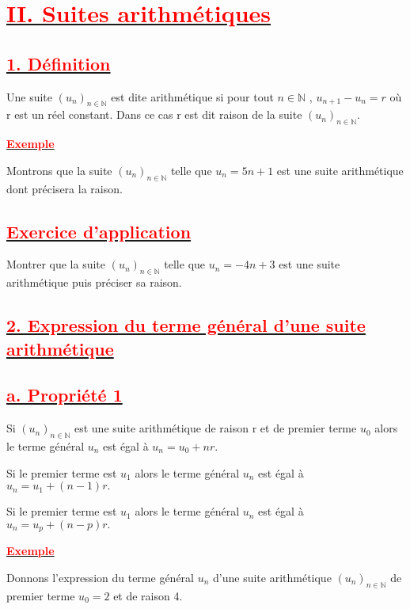\documentclass[12pt]{article}
\begin{document}
\section*{\underline{\textbf{\textcolor{red}{II. Suites arithmétiques}}}}
\subsection*{\underline{\textbf{\textcolor{red}{1. Définition}}}}
Une suite $(u_{n})_{n\in\mathbb{N}}$ est dite arithmétique si pour tout $n\in\mathbb{N}$ , $u_{n+1} - u_{n} = r$ où r est un réel constant. Dans ce cas r est dit raison de la suite $(u_{n})_{n\in\mathbb{N}}$.

\underline{\textbf{\textcolor{red}{Exemple}}}

Montrons que la suite $(u_{n})_{n\in\mathbb{N}}$ telle que $u_{n} = 5n + 1$ est une suite arithmétique dont précisera la raison.
\subsection*{\underline{\textbf{\textcolor{red}{Exercice d'application}}}}
Montrer que la suite $(u_{n})_{n\in\mathbb{N}}$ telle que $u_{n} = -4n + 3$ est une suite arithmétique puis
préciser sa raison.
\subsection*{\underline{\textbf{\textcolor{red}{2. Expression du terme général d’une suite arithmétique}}}}
\subsection*{\underline{\textbf{\textcolor{red}{a. Propriété 1}}}}
Si $(u_{n})_{n\in\mathbb{N}}$ est une suite arithmétique de raison r et de premier terme $u_{0}$ alors le terme général $u_{n}$ est égal à $u_{n} = u_{0} + nr.$

Si le premier terme est $u_{1}$ alors le terme général $u_{n}$ est égal à \\$u_{n} = u_{1} + (n-1)r.$

Si le premier terme est $u_{1}$ alors le terme général $u_{n}$ est égal à \\$u_{n} = u_{p} + (n-p)r.$

\underline{\textbf{\textcolor{red}{Exemple}}}

Donnons l’expression du terme général $u_{n}$ d’une suite arithmétique $(u_{n})_{n\in\mathbb{N}}$ de premier terme $u_{0} = 2$ et de raison 4.
\end{document}
